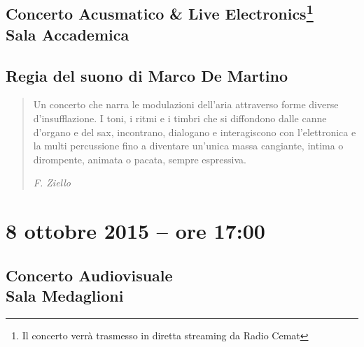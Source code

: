 \documentclass[8pt, twoside, a5paper]{extreport}
\begin{document}
\subsection*{{\small Concerto Acusmatico \& Live Electronics\footnote{ Il concerto verrà trasmesso in diretta streaming da Radio Cemat}} \\
	\textsf{Sala Accademica}}

{\fontsize{30}{30} }

\subsection*{\textsf{Regia del suono di Marco De Martino}}

\begin{quote}
{\svolk \small
Un concerto che narra le modulazioni dell’aria attraverso forme diverse d’insufflazione. I toni, i ritmi e i timbri che si diffondono dalle canne d’organo e del sax, incontrano, dialogano e interagiscono con l’elettronica e la multi percussione fino a diventare un’unica massa cangiante, intima o dirompente, animata o pacata, sempre espressiva.}

\emph{F. Ziello}
\end{quote}    




\begin{multicols}{2}




\end{multicols}

\clearpage


\section*{8 ottobre 2015 -- ore 17:00}

\subsection*{{\small Concerto Audiovisuale} \\
	\textsf{Sala Medaglioni}}
\end{document}
